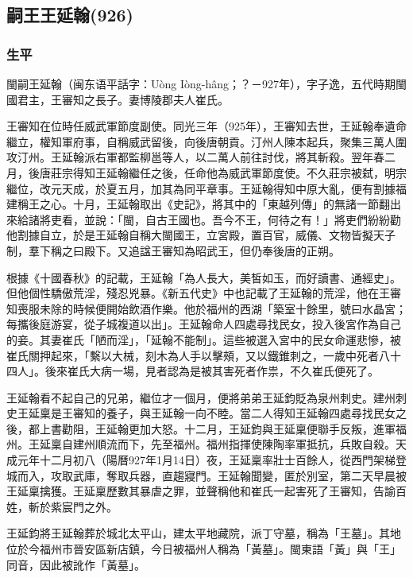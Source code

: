 
\subsection{嗣王王延翰\tiny(926)}

\subsubsection{生平}

閩嗣王延翰（闽东语平話字：Uòng Iòng-hâng；？－927年），字子逸，五代時期閩國君主，王審知之長子。妻博陵郡夫人崔氏。

王審知在位時任威武軍節度副使。同光三年（925年），王審知去世，王延翰奉遺命繼立，權知軍府事，自稱威武留後，向後唐朝貢。汀州人陳本起兵，聚集三萬人圍攻汀州。王延翰派右軍都監柳邕等人，以二萬人前往討伐，將其斬殺。翌年春二月，後唐莊宗得知王延翰繼任之後，任命他為威武軍節度使。不久莊宗被弑，明宗繼位，改元天成，於夏五月，加其為同平章事。王延翰得知中原大亂，便有割據福建稱王之心。十月，王延翰取出《史記》，將其中的「東越列傳」的無諸一節翻出來給諸將吏看，並說：「閩，自古王國也。吾今不王，何待之有！」將吏們紛紛勸他割據自立，於是王延翰自稱大閩國王，立宮殿，置百官，威儀、文物皆擬天子制，羣下稱之曰殿下。又追諡王審知為昭武王，但仍奉後唐的正朔。

根據《十國春秋》的記載，王延翰「為人長大，美皙如玉，而好讀書、通經史」。但他個性驕傲荒淫，殘忍兇暴。《新五代史》中也記載了王延翰的荒淫，他在王審知喪服未除的時候便開始飲酒作樂。他於福州的西湖「築室十餘里，號曰水晶宮；每攜後庭游宴，從子城複道以出」。王延翰命人四處尋找民女，投入後宮作為自己的妾。其妻崔氏「陋而淫」，「延翰不能制」。這些被選入宮中的民女命運悲慘，被崔氏關押起來，「繫以大械，刻木為人手以擊頰，又以鐵錐刺之，一歲中死者八十四人」。後來崔氏大病一場，見者認為是被其害死者作祟，不久崔氏便死了。

王延翰看不起自己的兄弟，繼位才一個月，便將弟弟王延鈞貶為泉州刺史。建州刺史王延稟是王審知的養子，與王延翰一向不睦。當二人得知王延翰四處尋找民女之後，都上書勸阻，王延翰更加大怒。十二月，王延鈞與王延稟便聯手反叛，進軍福州。王延稟自建州順流而下，先至福州。福州指揮使陳陶率軍抵抗，兵敗自殺。天成元年十二月初八（陽曆927年1月14日）夜，王延稟率壯士百餘人，從西門架梯登城而入，攻取武庫，奪取兵器，直趨寢門。王延翰聞變，匿於別室，第二天早晨被王延稟擒獲。王延稟歷數其暴虐之罪，並聲稱他和崔氏一起害死了王審知，告諭百姓，斬於紫宸門之外。

王延鈞將王延翰葬於城北太平山，建太平地藏院，派丁守墓，稱為「王墓」。其地位於今福州市晉安區新店鎮，今日被福州人稱為「黃墓」。閩東語「黃」與「王」同音，因此被訛作「黃墓」。

